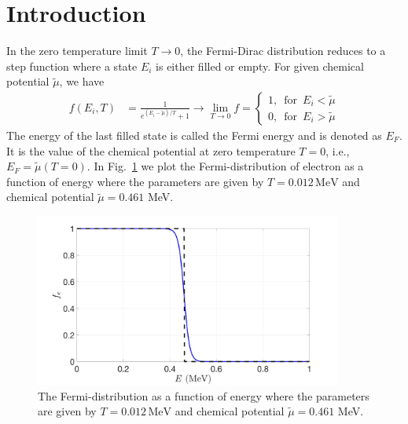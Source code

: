 \documentclass[sn-mathphys,Numbered]{sn-jnl}
\theoremstyle{thmstyleone}%
\theoremstyle{thmstyletwo}%
\theoremstyle{thmstylethree}%
\begin{document}
\date{To be published in International Journal of Theoretical Physics}



\maketitle

\section{Introduction}\label{sec1}
In the zero temperature limit $T\rightarrow0$, the Fermi-Dirac distribution reduces to a step function where a state $E_{i}$ is either filled or empty. For given chemical potential $\tilde\mu$, we have
\begin{align}\label{f_old}
f(E_{i},T)&=\frac{1}{e^{(E_{i}-\tilde{\mu})/T}+1}\rightarrow
\lim_{T\to0}f=\left\{
\begin{array}{c}
1,\,\,\,\mathrm{for}\,\,\,{E_{i}}<\tilde{\mu}\\
0,\,\,\,\mathrm{for}\,\,\, {E_{i}}>\tilde{\mu}
\end{array}
\right.
\end{align}
The energy of the last filled state is called the Fermi energy and is denoted as $E_F$. It is the value of the chemical potential at zero temperature $T=0$, i.e., $E_F=\tilde\mu(T = 0)$. In Fig.~\ref{Electron_001} we plot the Fermi-distribution of electron as a function of energy where the parameters are given by $T=0.012\,\mathrm{MeV}$ and chemical potential $\tilde\mu=0.461$ MeV.

\begin{figure}[h]
\begin{center}
\includegraphics[width=0.9\textwidth]{./plot/Electron_distribution001}
\caption{The Fermi-distribution  as a function of energy where the parameters are given by $T=0.012\,\mathrm{MeV}$ and chemical potential $\tilde\mu=0.461$ MeV.}
\label{Electron_001}
\end{center}
\end{figure}
\end{document}
